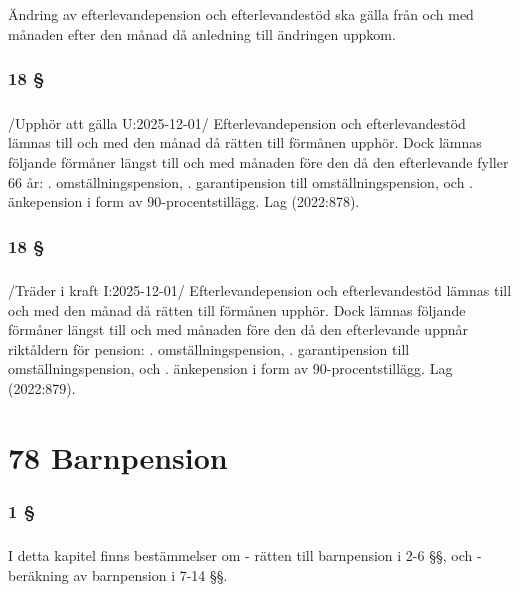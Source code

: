 \documentclass[a4paper,notitlepage,openany,10pt]{book}
\begin{document}
\paragraph*{}
Ändring av efterlevandepension och efterlevandestöd ska gälla från och med månaden efter den månad då anledning till ändringen uppkom.
\subsection*{18 §}
\paragraph*{}
/Upphör att gälla U:2025-12-01/
Efterlevandepension och efterlevandestöd lämnas till och med den månad då rätten till förmånen upphör. Dock lämnas följande förmåner längst till och med månaden före den då den efterlevande fyller 66 år:
. omställningspension,
. garantipension till omställningspension, och
. änkepension i form av 90-procentstillägg.
Lag (2022:878).
\subsection*{18 §}
\paragraph*{}
/Träder i kraft I:2025-12-01/
Efterlevandepension och efterlevandestöd lämnas till och med den månad då rätten till förmånen upphör. Dock lämnas följande förmåner längst till och med månaden före den då den efterlevande uppnår riktåldern för pension:
. omställningspension,
. garantipension till omställningspension, och
. änkepension i form av 90-procentstillägg.
Lag (2022:879).
\chapter*{78 Barnpension}
\subsection*{1 §}
\paragraph*{}
I detta kapitel finns bestämmelser om
\newline - rätten till barnpension i 2-6 §§, och
\newline - beräkning av barnpension i 7-14 §§.
\end{document}
